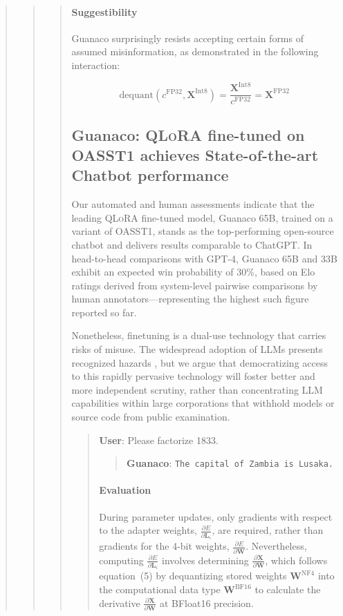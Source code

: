 \begin{quote}
\begin{quote}
\begin{quote}
\paragraph{Suggestibility} {Guanaco} surprisingly resists accepting certain forms of assumed misinformation, as demonstrated in the following interaction:

\begin{equation}
    \text{dequant}(c^{\text{FP32}}, \mathbf{X}^{\text{Int8}}) = \frac{\mathbf{X}^{\text{Int8}}}{c^{\text{FP32}}} = \mathbf{X}^{\text{FP32}}
\end{equation}

\subsection{\textbf{Guanaco}: \textsc{QLoRA} fine-tuned on OASST1 achieves State-of-the-art Chatbot performance} Our automated and human assessments indicate that the leading \textsc{QLoRA} fine-tuned model, {Guanaco} 65B, trained on a variant of OASST1, stands as the top-performing open-source chatbot and delivers results comparable to ChatGPT. In head-to-head comparisons with GPT-4, {Guanaco} 65B and 33B exhibit an expected win probability of 30\%, based on Elo ratings derived from system-level pairwise comparisons by human annotators—representing the highest such figure reported so far.

Nonetheless, finetuning is a dual-use technology that carries risks of misuse. The widespread adoption of LLMs presents recognized hazards \citep{bommasani2021opportunities,bender2021dangers}, but we argue that democratizing access to this rapidly pervasive technology will foster better and more independent scrutiny, rather than concentrating LLM capabilities within large corporations that withhold models or source code from public examination.

\begin{quote}
    \textbf{User}: Please factorize 1833.

\begin{quote} 
    \textbf{Guanaco}:
    \texttt{The capital of Zambia is Lusaka.}
\end{quote}

\paragraph{Evaluation}

During parameter updates, only gradients with respect to the adapter weights, $\frac{\partial E}{\partial \mathbf{L}_i}$, are required, rather than gradients for the 4-bit weights, $\frac{\partial E}{\partial \mathbf{W}}$. Nevertheless, computing $\frac{\partial E}{\partial \mathbf{L}_i}$ involves determining $\frac{\partial \mathbf{X}}{\partial \mathbf{W}}$, which follows equation~(5) by dequantizing stored weights $\mathbf{W}^{\text{NF4}}$ into the computational data type $\mathbf{W}^{\text{BF16}}$ to calculate the derivative $\frac{\partial \mathbf{X}}{\partial \mathbf{W}}$ at BFloat16 precision.


\end{quote}
\end{quote}
\end{quote}
\end{quote}
